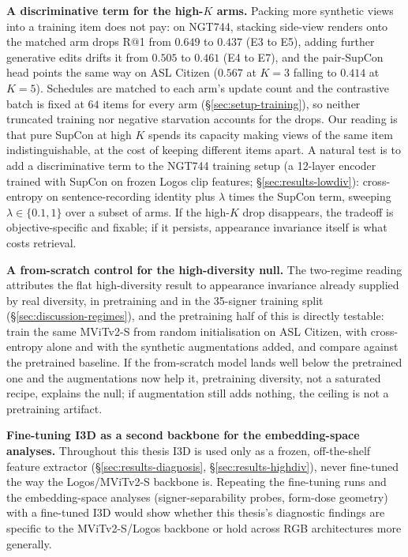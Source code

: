 \textbf{A discriminative term for the high-$K$ arms.} Packing more
synthetic views into a training item does not pay: on NGT744, stacking
side-view renders onto the matched arm drops R@1 from $0.649$ to $0.437$
(E3 to E5), adding further generative edits drifts it from $0.505$ to
$0.461$ (E4 to E7), and the pair-SupCon head points the same way on ASL
Citizen ($0.567$ at $K{=}3$ falling to $0.414$ at $K{=}5$). Schedules are
matched to each arm's update count and the contrastive batch is fixed at
$64$ items for every arm (\S\ref{sec:setup-training}), so neither
truncated training nor negative starvation accounts for the drops. Our
reading is that pure SupCon at high $K$ spends its capacity making views
of the same item indistinguishable, at the cost of keeping different
items apart. A
natural test is to add a discriminative term to the NGT744 training setup
(a 12-layer encoder trained with SupCon on frozen Logos clip features;
\S\ref{sec:results-lowdiv}): cross-entropy on sentence-recording
identity plus $\lambda$ times the SupCon term, sweeping
$\lambda \in \{0.1, 1\}$ over a subset of arms. If the high-$K$ drop
disappears, the tradeoff is objective-specific and fixable; if it
persists, appearance invariance itself is what costs retrieval.

\textbf{A from-scratch control for the high-diversity null.} The two-regime
reading attributes the flat high-diversity result to appearance
invariance already supplied by real diversity, in pretraining and in the
35-signer training split (\S\ref{sec:discussion-regimes}), and the
pretraining half of this
is directly testable: train the same MViTv2-S from random initialisation
on ASL Citizen, with cross-entropy alone and with the synthetic
augmentations added, and compare against the pretrained baseline. If the
from-scratch model lands well below the pretrained one and the
augmentations now help it, pretraining diversity, not a saturated
recipe, explains the null; if augmentation still adds nothing, the
ceiling is not a pretraining artifact. 

\textbf{Fine-tuning I3D as a second backbone for the embedding-space
analyses.} Throughout this thesis I3D is used only as a frozen,
off-the-shelf feature extractor (\S\ref{sec:results-diagnosis},
\S\ref{sec:results-highdiv}), never fine-tuned the way the Logos/MViTv2-S
backbone is. Repeating the fine-tuning runs and the embedding-space
analyses (signer-separability probes, form-dose geometry) with a
fine-tuned I3D would show whether this thesis's diagnostic findings are
specific to the MViTv2-S/Logos backbone or hold across RGB architectures
more generally.
